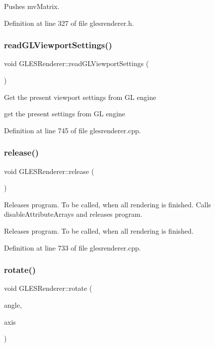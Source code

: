 Pushes mv\+Matrix. 

Definition at line 327 of file glesrenderer.\+h.

\mbox{\label{class_g_l_e_s_renderer_aadd9caa2f116226fa3d896bbad437e90}} 
\subsubsection{\texorpdfstring{readGLViewportSettings()}{readGLViewportSettings()}}
{\footnotesize\ttfamily void G\+L\+E\+S\+Renderer\+::read\+G\+L\+Viewport\+Settings (\begin{DoxyParamCaption}{ }\end{DoxyParamCaption})}

Get the present viewport settings from GL engine

get the present settings from GL engine 

Definition at line 745 of file glesrenderer.\+cpp.

\mbox{\label{class_g_l_e_s_renderer_a860d9102e98cd4394dc91c56e61c512b}} 
\subsubsection{\texorpdfstring{release()}{release()}}
{\footnotesize\ttfamily void G\+L\+E\+S\+Renderer\+::release (\begin{DoxyParamCaption}{ }\end{DoxyParamCaption})}

Releases program. To be called, when all rendering is finished. Calls disable\+Attribute\+Arrays and releases program.

Releases program. To be called, when all rendering is finished. 

Definition at line 733 of file glesrenderer.\+cpp.

\mbox{\label{class_g_l_e_s_renderer_a9e034d2d95eedc35a56f8db1688df163}} 
\subsubsection{\texorpdfstring{rotate()}{rotate()}\hspace{0.1cm}{\footnotesize\ttfamily [1/2]}}
{\footnotesize\ttfamily void G\+L\+E\+S\+Renderer\+::rotate (\begin{DoxyParamCaption}\item[{G\+Lfloat}]{angle,  }\item[{const Q\+Vector3D \&}]{axis }\end{DoxyParamCaption})}

